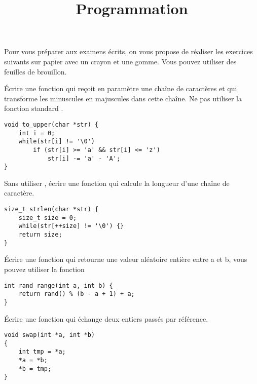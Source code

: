 \documentclass[french,a4paper,addpoints,11pt]{exam}
\title{Programmation}
\begin{document}
\maketitle

Pour vous préparer aux examens écrits, on vous propose de réaliser les exercices suivants sur papier avec un crayon et une gomme. Vous pouvez utiliser des feuilles de brouillon.

\begin{questions}

\question Écrire une fonction qui reçoit en paramètre une chaîne de caractères et qui transforme les minuscules en majuscules dans cette chaîne. Ne pas utiliser la fonction standard .

\begin{solutionordottedlines}[6cm]
\begin{lstlisting}
void to_upper(char *str) {
    int i = 0;
    while(str[i] != '\0')
        if (str[i] >= 'a' && str[i] <= 'z')
            str[i] -= 'a' - 'A';
}
\end{lstlisting}
\end{solutionordottedlines}

\question Sans utiliser , écrire une fonction qui calcule la longueur d'une chaîne de caractère.

\begin{solutionordottedlines}[5cm]
\begin{lstlisting}
size_t strlen(char *str) {
    size_t size = 0;
    while(str[++size] != '\0') {}
    return size;
}
\end{lstlisting}
\end{solutionordottedlines}

\question Écrire une fonction qui retourne une valeur aléatoire entière entre a et b, vous pouvez utiliser la fonction 

\begin{solutionordottedlines}[3cm]
\begin{lstlisting}
int rand_range(int a, int b) {
    return rand() % (b - a + 1) + a;
}
\end{lstlisting}
\end{solutionordottedlines}

\question Écrire une fonction qui échange deux entiers passés par référence.

\begin{solutionordottedlines}[7cm]
\begin{lstlisting}
void swap(int *a, int *b)
{
    int tmp = *a;
    *a = *b;
    *b = tmp;
}
\end{lstlisting}
\end{solutionordottedlines}


\end{questions}
\end{document}
